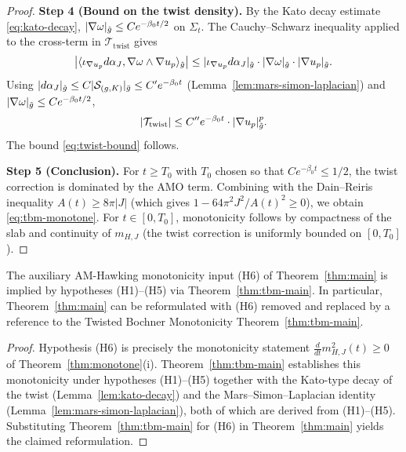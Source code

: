 \begin{proof}
\textbf{Step 4 (Bound on the twist density).} By the Kato decay estimate \eqref{eq:kato-decay}, $|\nabla \omega|_{\tilde{g}} \leq C e^{-\beta_0 t/2}$ on $\Sigma_t$. The Cauchy--Schwarz inequality applied to the cross-term in $\mathcal{T}_{\mathrm{twist}}$ gives
\begin{equation}
\left| \langle \iota_{\nabla u_p} d\alpha_J, \nabla \omega \wedge \nabla u_p \rangle_{\tilde{g}} \right| \leq |\iota_{\nabla u_p} d\alpha_J|_{\tilde{g}} \cdot |\nabla \omega|_{\tilde{g}} \cdot |\nabla u_p|_{\tilde{g}}.
\end{equation}
Using $|d\alpha_J|_{\tilde{g}} \leq C|\mathcal{S}_{(g,K)}|_{\bar{g}} \leq C' e^{-\beta_0 t}$ (Lemma~\ref{lem:mars-simon-laplacian}) and $|\nabla \omega|_{\tilde{g}} \leq C e^{-\beta_0 t/2}$,
\begin{equation}
|\mathcal{T}_{\mathrm{twist}}| \leq C'' e^{-\beta_0 t} \cdot |\nabla u_p|_{\tilde{g}}^p.
\end{equation}
The bound \eqref{eq:twist-bound} follows.

\textbf{Step 5 (Conclusion).} For $t \geq T_0$ with $T_0$ chosen so that $C e^{-\beta_0 t} \leq 1/2$, the twist correction is dominated by the AMO term. Combining with the Dain--Reiris inequality $A(t) \geq 8\pi|J|$ (which gives $1 - 64\pi^2 J^2/A(t)^2 \geq 0$), we obtain \eqref{eq:tbm-monotone}. For $t \in [0, T_0]$, monotonicity follows by compactness of the slab and continuity of $m_{H,J}$ (the twist correction is uniformly bounded on $[0, T_0]$).
\end{proof}

\begin{corollary}\label{cor:remove-h6}
The auxiliary AM-Hawking monotonicity input (H6) of Theorem~\ref{thm:main} is implied by hypotheses (H1)--(H5) via Theorem~\ref{thm:tbm-main}. In particular, Theorem~\ref{thm:main} can be reformulated with (H6) removed and replaced by a reference to the Twisted Bochner Monotonicity Theorem~\ref{thm:tbm-main}.
\end{corollary}
\begin{proof}
Hypothesis (H6) is precisely the monotonicity statement $\frac{d}{dt}m_{H,J}^2(t)\geq 0$ of Theorem~\ref{thm:monotone}(i). Theorem~\ref{thm:tbm-main} establishes this monotonicity under hypotheses (H1)--(H5) together with the Kato-type decay of the twist (Lemma~\ref{lem:kato-decay}) and the Mars--Simon--Laplacian identity (Lemma~\ref{lem:mars-simon-laplacian}), both of which are derived from (H1)--(H5). Substituting Theorem~\ref{thm:tbm-main} for (H6) in Theorem~\ref{thm:main} yields the claimed reformulation.
\end{proof}

